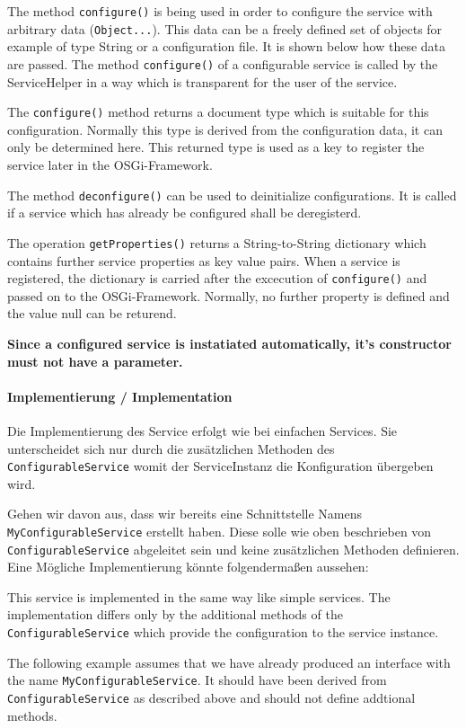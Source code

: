 \documentclass[10pt,a4paper]{scrartcl}
\providecommand{\deng}[2]{#1 / {\sffamily #2}}
\providecommand{\deutsch}[1]{#1}
\providecommand{\englisch}[1]{{\sffamily #1}}
\begin{document}
\englisch{The method \texttt{configure()} is being used in order to configure
the service with arbitrary data (\texttt{Object...}). This data can be a freely
defined set of objects for example of type String or a configuration file. It is
shown below how these data are passed. The method \texttt{configure()} of a
configurable service is called by the ServiceHelper in a way which is
transparent for the user of the service. 

The \texttt{configure()} method returns a document type which is suitable for
this configuration. Normally this type is derived from the configuration data,
it can only be determined here. This returned type is used as a key to register
the service later in the OSGi-Framework.

The method \texttt{deconfigure()} can be used to deinitialize configurations. It
is called if a service which has already be configured shall be deregisterd.

The operation \texttt{getProperties()} returns a String-to-String dictionary
which contains further service properties as key value pairs. When a service is
registered, the dictionary is carried after the excecution of
\texttt{configure()} and passed on to the OSGi-Framework. Normally, no further
property is defined and the value null can be returend.

\textbf{Since a configured service is instatiated automatically, it's 
constructor must not have a parameter.}}

\paragraph{\deng{Implementierung}{Implementation}}
\deutsch{Die Implementierung des Service erfolgt wie bei einfachen Services. Sie
unterscheidet sich nur durch die zusätzlichen Methoden des 
\texttt{ConfigurableService} womit der ServiceInstanz die Konfiguration
übergeben wird.

Gehen wir davon aus, dass wir bereits eine Schnittstelle Namens
\texttt{MyConfigurableService} erstellt haben. Diese solle wie oben beschrieben
von \texttt{ConfigurableService} abgeleitet sein und keine zusätzlichen Methoden
definieren. Eine Mögliche Implementierung könnte folgendermaßen aussehen:}

\englisch{This service is implemented in the same way like simple services. The
implementation differs only by the additional methods of the
\texttt{ConfigurableService} which provide the configuration to the service
instance.

The following example assumes that we have already produced an interface with
the name \texttt{MyConfigurableService}. It should have been derived from
\texttt{ConfigurableService} as described above and should not define addtional
methods.}
\end{document}
